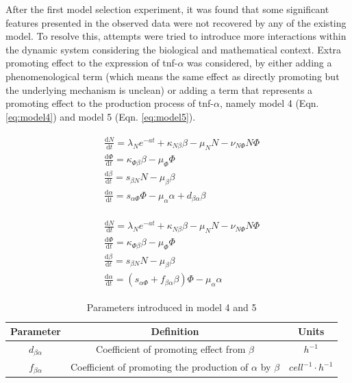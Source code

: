 \documentclass[12pt,a4paper]{report}
\begin{document}
After the first model selection experiment, it was found that some significant features presented in the observed data were not recovered by any of the existing model. To resolve this, attempts were tried to introduce more interactions within the dynamic system considering the biological and  mathematical context. Extra promoting effect to the expression of tnf-$\alpha$ was considered, by either adding a phenomenological term (which means the same effect as directly promoting but the underlying mechanism is unclean) or adding a term that represents a promoting effect to the production process of tnf-$\alpha$, namely model 4 (Eqn. \ref{eq:model4}) and model 5 (Eqn. \ref{eq:model5}).

\begin{align}
    \label{eq:model4}
    \begin{split}
        &\frac{\mathrm{d} N}{\mathrm{d} t}=\lambda_Ne^{-at}+\kappa_{N\beta}\beta-\mu_NN-\nu_{N\Phi}N\Phi\\
        &\frac{\mathrm{d} \Phi}{\mathrm{d} t}=\kappa_{\Phi\beta}\beta-\mu_\Phi\Phi\\
        &\frac{\mathrm{d} \beta}{\mathrm{d} t}=s_{\beta N}N-\mu_\beta\beta\\
        &\frac{\mathrm{d} \alpha}{\mathrm{d} t}=s_{\alpha\Phi}\Phi-\mu_\alpha\alpha+d_{\beta\alpha}\beta
    \end{split}
\end{align}

\begin{align}
    \label{eq:model5}
    \begin{split}
        &\frac{\mathrm{d} N}{\mathrm{d} t}=\lambda_Ne^{-at}+\kappa_{N\beta}\beta-\mu_NN-\nu_{N\Phi}N\Phi\\
        &\frac{\mathrm{d} \Phi}{\mathrm{d} t}=\kappa_{\Phi\beta}\beta-\mu_\Phi\Phi\\
        &\frac{\mathrm{d} \beta}{\mathrm{d} t}=s_{\beta N}N-\mu_\beta\beta\\
        &\frac{\mathrm{d} \alpha}{\mathrm{d} t}=(s_{\alpha\Phi}+f_{\beta\alpha}\beta)\Phi-\mu_\alpha\alpha
    \end{split}
\end{align}

\begin{table}[h!]
    \centering
    \begin{tabular}{|c c c|} 
     \hline
     Parameter & Definition & Units\\ [0.5ex] 
     \hline\hline
     $d_{\beta\alpha}$ & Coefficient of promoting effect from $\beta$ & $h^{-1}$  \\ 
     \hline
     $f_{\beta\alpha}$ & Coefficient of promoting the production of $\alpha$ by $\beta$ & $cell^{-1}\cdotp h^{-1}$  \\ 
     \hline
    \end{tabular}
    \caption{Parameters introduced in model 4 and 5}
    \label{table:m45}
\end{table}
\end{document}
